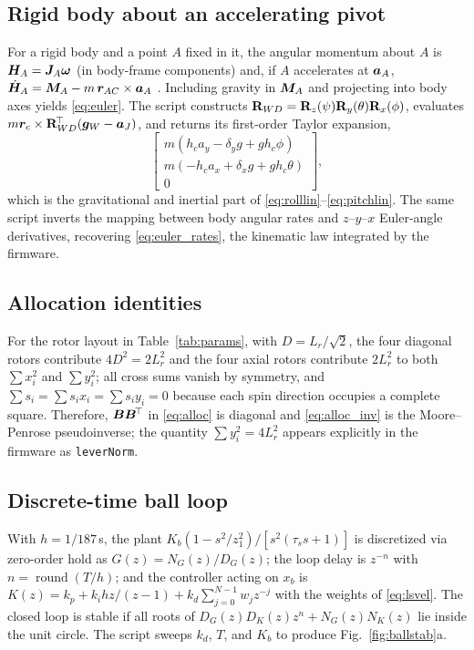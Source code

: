 \subsection{Rigid body about an accelerating pivot}
For a rigid body and a point $A$ fixed in it, the angular momentum about $A$ is $\bm{H}_A=\bm{J}_A\bm{\omega}$ (in body-frame components) and, if $A$ accelerates at $\bm{a}_A$, $\dot{\bm{H}}_A=\bm{M}_A-m\,\bm{r}_{AC}\times\bm{a}_A$ \cite{ginsberg1998}. Including gravity in $\bm{M}_A$ and projecting into body axes yields \eqref{eq:euler}. The script  constructs $\mathbf{R}_{WD}=\mathbf{R}_z(\psi)\mathbf{R}_y(\theta)\mathbf{R}_x(\phi)$, evaluates $m\bm{r}_c\times\mathbf{R}_{WD}^{\!\top}(\bm{g}_W-\bm{a}_J)$, and returns its first-order Taylor expansion,
\begin{equation}
  \begin{bmatrix}m(h_ca_y-\delta_yg+gh_c\phi)\\ m(-h_ca_x+\delta_xg+gh_c\theta)\\ 0\end{bmatrix},
  \tag{A.3}
\end{equation}
which is the gravitational and inertial part of \eqref{eq:rolllin}--\eqref{eq:pitchlin}. The same script inverts the mapping between body angular rates and $z$--$y$--$x$ Euler-angle derivatives, recovering \eqref{eq:euler_rates}, the kinematic law integrated by the firmware.

\subsection{Allocation identities}
For the rotor layout in Table~\ref{tab:params}, with $D=L_r/\sqrt2$, the four diagonal rotors contribute $4D^2=2L_r^2$ and the four axial rotors contribute $2L_r^2$ to both $\sum x_i^2$ and $\sum y_i^2$; all cross sums vanish by symmetry, and $\sum s_i=\sum s_ix_i=\sum s_iy_i=0$ because each spin direction occupies a complete square. Therefore, $\bm{B}\bm{B}^{\!\top}$ in \eqref{eq:alloc} is diagonal and \eqref{eq:alloc_inv} is the Moore--Penrose pseudoinverse; the quantity $\sum y_i^2=4L_r^2$ appears explicitly in the firmware as \texttt{leverNorm}.

\subsection{Discrete-time ball loop}
With $h=1/187$\,s, the plant $K_b(1-s^2/z_1^2)/[s^2(\tau_ss+1)]$ is discretized via zero-order hold as $G(z)=N_G(z)/D_G(z)$; the loop delay is $z^{-n}$ with $n=\operatorname{round}(T/h)$; and the controller acting on $x_b$ is $K(z)=k_p+k_ihz/(z-1)+k_d\sum_{j=0}^{N-1}w_jz^{-j}$ with the weights of \eqref{eq:lsvel}. The closed loop is stable if all roots of $D_G(z)D_K(z)z^{n}+N_G(z)N_K(z)$ lie inside the unit circle. The script  sweeps $k_d$, $T$, and $K_b$ to produce Fig.~\ref{fig:ballstab}a.

